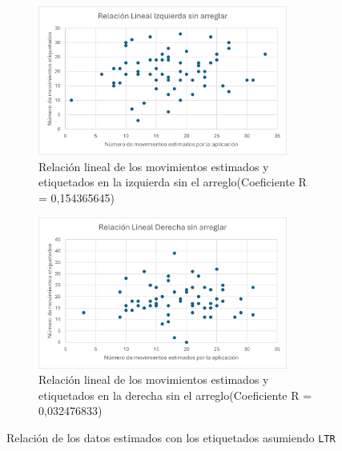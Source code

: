\begin{figure}[H]
    \centering
    \begin{subfigure}[b]{0.7\textwidth}
        \centering
        \includegraphics[width=0.9\textwidth]{images/7/IzquierdaMal.png}
        \caption{Relación lineal de los movimientos estimados y etiquetados en la izquierda sin el arreglo(Coeficiente R = 0,154365645)}
    \end{subfigure}
    \begin{subfigure}[b]{0.7\textwidth}
        \centering
        \includegraphics[width=0.9\textwidth]{images/7/DerechaMal.png}
        \caption{Relación lineal de los movimientos estimados y etiquetados en la derecha sin el arreglo(Coeficiente R = 0,032476833)}
    \end{subfigure}
    \caption{Relación de los datos estimados con los etiquetados asumiendo \texttt{LTR}}
    \label{fig:EtiquetadosMal}
\end{figure}

